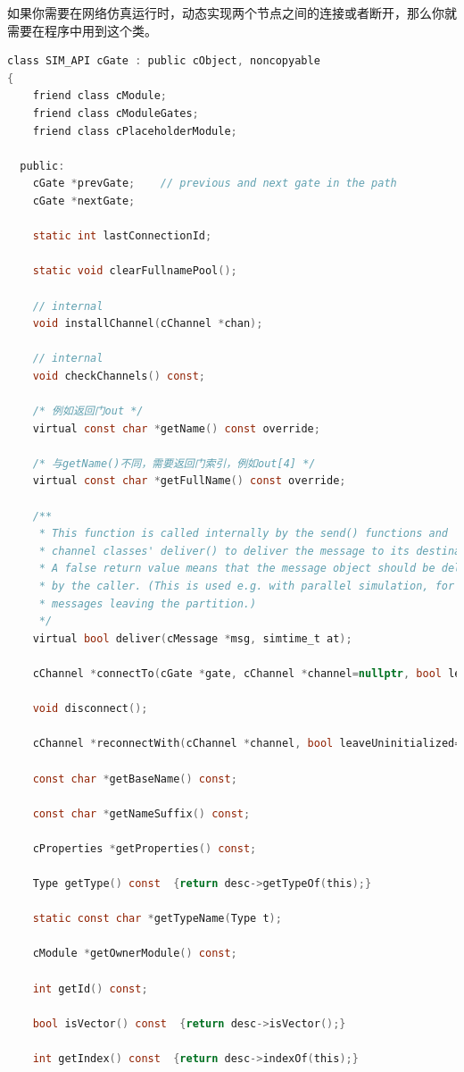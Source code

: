 如果你需要在网络仿真运行时，动态实现两个节点之间的连接或者断开，那么你就需要在程序中用到这个类。

\begin{lstlisting}[language=c]
class SIM_API cGate : public cObject, noncopyable
{
    friend class cModule;
    friend class cModuleGates;
    friend class cPlaceholderModule;

  public:
    cGate *prevGate;    // previous and next gate in the path
    cGate *nextGate;

    static int lastConnectionId;

    static void clearFullnamePool();

    // internal
    void installChannel(cChannel *chan);

    // internal
    void checkChannels() const;

    /* 例如返回门out */
    virtual const char *getName() const override;

    /* 与getName()不同，需要返回门索引，例如out[4] */
    virtual const char *getFullName() const override;

    /**
     * This function is called internally by the send() functions and
     * channel classes' deliver() to deliver the message to its destination.
     * A false return value means that the message object should be deleted
     * by the caller. (This is used e.g. with parallel simulation, for
     * messages leaving the partition.)
     */
    virtual bool deliver(cMessage *msg, simtime_t at);

    cChannel *connectTo(cGate *gate, cChannel *channel=nullptr, bool leaveUninitialized=false);

    void disconnect();

    cChannel *reconnectWith(cChannel *channel, bool leaveUninitialized=false);

    const char *getBaseName() const;

    const char *getNameSuffix() const;

    cProperties *getProperties() const;

    Type getType() const  {return desc->getTypeOf(this);}

    static const char *getTypeName(Type t);

    cModule *getOwnerModule() const;

    int getId() const;

    bool isVector() const  {return desc->isVector();}

    int getIndex() const  {return desc->indexOf(this);}


\end{lstlisting}
